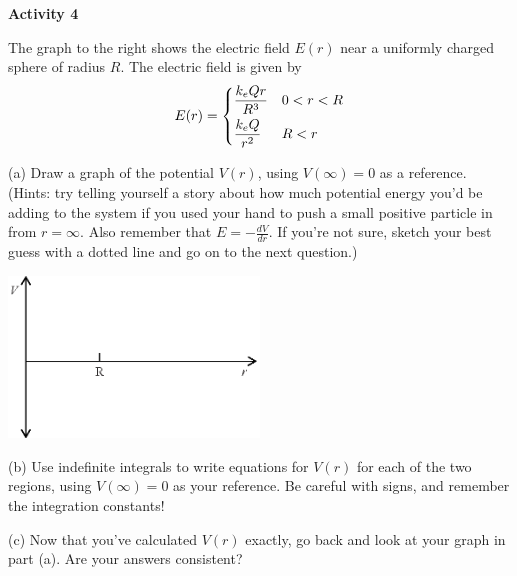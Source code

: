 \textbf{Activity 4} 

The graph to the right shows the electric field $E(r)$ near a uniformly charged sphere of radius $R$.  The electric field is given by
\begin{displaymath}
E(r) = \begin{dcases}
        \frac{k_eQr}{R^3}  &  0<r<R\\
        \frac{k_eQ}{r^2}  &  R<r
        \end{dcases}
\end{displaymath}




\vspace{0.5in}

(a) Draw a graph of the potential $V(r)$, using $V(\infty)=0$ as a reference.  (Hints: try telling yourself a story about how much potential energy you'd be adding to the system if you used your hand to push a small positive particle in from $r=\infty$.  Also remember that $E = - \frac{dV}{dr}$.  If you're not sure, sketch your best guess with a dotted line and go on to the next question.)
\begin{center}
\includegraphics[width=0.5\textwidth]{finding_v_from_e/fig8.eps}
\end{center}

(b) Use indefinite integrals to write equations for $V(r)$ for each of the two regions, using $V(\infty)=0$ as your reference.  Be careful with signs, and remember the integration constants!
\answerspace{1.3in}

\vfill
(c) Now that you've calculated $V(r)$ exactly, go back and look at your graph in part (a).  Are your answers consistent?
